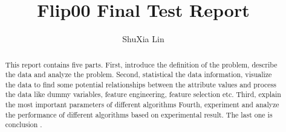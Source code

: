 \documentclass{amsart}
\begin{document}
%
%
\title[Lin's Flip00 ]{Flip00 Final Test Report}%

\author{ShuXia Lin}
\address[A.~1]{School of Computer Science,\\ 
SouthEast University, Nanjing , China}%




%
\date{\gitAuthorDate}%

\begin{abstract}
This report contains five parts. 
First, 
introduce the definition of the problem,
describe the data and analyze the problem. 
Second, 
statistical the data information, 
visualize the data to find some potential relationships 
between the attribute values 
and process the data 
like dummy variables, feature engineering, feature selection etc. 
Third, 
explain the most important parameters 
of different algorithms
Fourth,
experiment and analyze the performance of different algorithms
based on experimental result.
The last one is conclusion . 
\end{abstract}

\maketitle
\tableofcontents

\newpage






\newpage



\listoftodos
\end{document}
